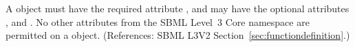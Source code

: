 A \FunctionDefinition object must have the required attribute ,
and may have the optional attributes ,  and
.  No other attributes from the SBML Level~3 Core namespace are
permitted on a \FunctionDefinition object.  (References: SBML L3V2
Section~\ref{sec:functiondefinition}.)

